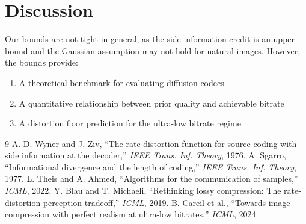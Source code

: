 \documentclass[11pt]{article}
\begin{document}
\section{Discussion}

Our bounds are not tight in general, as the side-information credit is an upper bound and the Gaussian assumption may not hold for natural images. However, the bounds provide:
\begin{enumerate}
    \item A theoretical benchmark for evaluating diffusion codecs
    \item A quantitative relationship between prior quality and achievable bitrate
    \item A distortion floor prediction for the ultra-low bitrate regime
\end{enumerate}

\begin{thebibliography}{9}
 A. D. Wyner and J. Ziv, ``The rate-distortion function for source coding with side information at the decoder,'' \textit{IEEE Trans. Inf. Theory}, 1976.
 A. Sgarro, ``Informational divergence and the length of coding,'' \textit{IEEE Trans. Inf. Theory}, 1977.
 L. Theis and A. Ahmed, ``Algorithms for the communication of samples,'' \textit{ICML}, 2022.
 Y. Blau and T. Michaeli, ``Rethinking lossy compression: The rate-distortion-perception tradeoff,'' \textit{ICML}, 2019.
 B. Careil et al., ``Towards image compression with perfect realism at ultra-low bitrates,'' \textit{ICML}, 2024.
\end{thebibliography}
\end{document}

